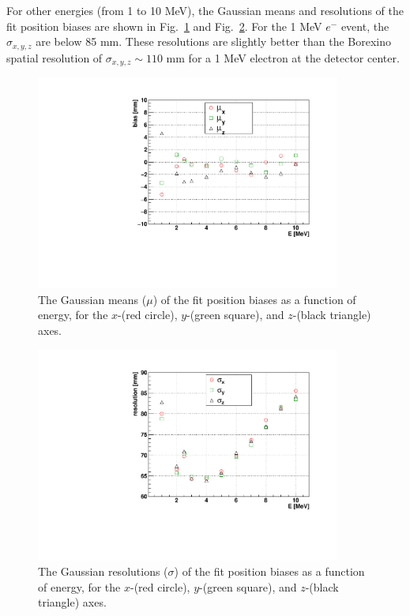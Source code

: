 For other energies (from 1 to 10 MeV), the Gaussian means and resolutions of the fit position biases are shown in Fig.~\ref{fig:scintBiasVsE} and Fig.~\ref{fig:scintResolVsE}. For the 1 MeV $e^-$ event, the $\sigma_{x,y,z}$ are below 85 mm. These resolutions are slightly better than the Borexino spatial resolution of $\sigma_{x,y,z} \sim 110$ mm for a 1 MeV electron at the detector center\cite{borexino2020experimental}.

\begin{figure}[!htb]
	\centering
	\includegraphics[width=10cm]{fullScintBiasVsE.pdf}
	\caption[The Gaussian means ($\mu$) of the \texttt{MP scint fitter} fit position biases as a function of energy, for the $x$, $y$, and $z$ axes.]{The Gaussian means ($\mu$) of the fit position biases as a function of energy, for the $x$-(red circle), $y$-(green square), and $z$-(black triangle) axes.}
	\label{fig:scintBiasVsE}
\end{figure}

\begin{figure}[!htb]
	\centering
	\includegraphics[width=10cm]{fullScintResolVsE.pdf}
	\caption[The Gaussian resolutions ($\sigma$) of the \texttt{MP scint fitter} fit position biases as a function of energy, for the $x$, $y$, and $z$ axes.]{The Gaussian resolutions ($\sigma$) of the fit position biases as a function of energy, for the $x$-(red circle), $y$-(green square), and $z$-(black triangle) axes.}
	\label{fig:scintResolVsE}
\end{figure}

